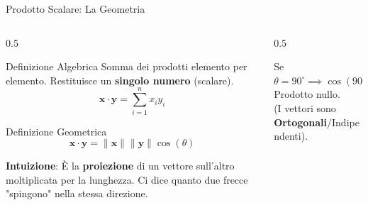 \documentclass[aspectratio=169, 10pt]{beamer}
\begin{document}
\begin{frame}{Prodotto Scalare: La Geometria}
    \begin{columns}[T]
        \begin{column}{0.5\textwidth}
            \begin{block}{Definizione Algebrica}
                Somma dei prodotti elemento per elemento. Restituisce un \textbf{singolo numero} (scalare).
                \[ \mathbf{x} \cdot \mathbf{y} = \sum_{i=1}^n x_i y_i \]
            \end{block}
            
            \begin{block}{Definizione Geometrica}
                \[ \mathbf{x} \cdot \mathbf{y} = \|\mathbf{x}\| \|\mathbf{y}\| \cos(\theta) \]
            \end{block}
            
            \small
            \textbf{Intuizione}:
            È la \textbf{proiezione} di un vettore sull'altro moltiplicata per la lunghezza. Ci dice quanto due frecce "spingono" nella stessa direzione.
        \end{column}

        \begin{column}{0.5\textwidth}
            \centering
            
            \vspace{1em}
            \scriptsize
            Se $\theta = 90^\circ \implies \cos(90)=0 \implies$ Prodotto nullo.\\
            (I vettori sono \textbf{Ortogonali}/Indipendenti).
        \end{column}
    \end{columns}
\end{frame}
\end{document}
